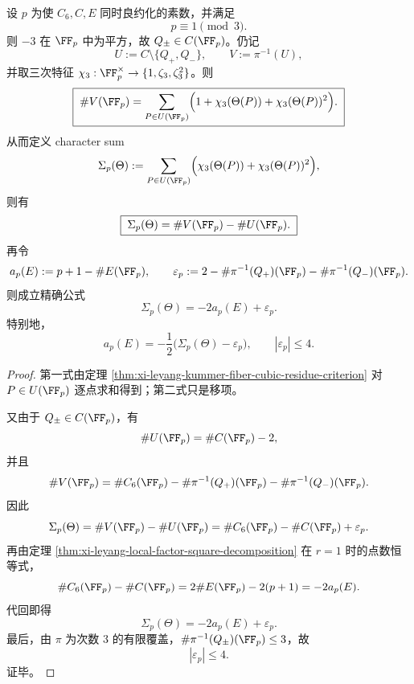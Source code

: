 \begin{corollary}\label{cor:xi-leyang-split-prime-cubic-character-sum-trace}
设 \(p\) 为使 \(C_6,C,E\) 同时良约化的素数，并满足
\[
p\equiv 1\pmod 3.
\]
则 \(-3\) 在 \(\FF_p\) 中为平方，故 \(Q_\pm\in C(\FF_p)\)。仍记
\[
U:=C\setminus\{Q_+,Q_-\},
\qquad
V:=\pi^{-1}(U),
\]
并取三次特征 \(\chi_3:\FF_p^\times\to\{1,\zeta_3,\zeta_3^2\}\)。则
\[
\boxed{\;
\#V(\FF_p)
=
\sum_{P\in U(\FF_p)}
\Bigl(1+\chi_3(\Theta(P))+\chi_3(\Theta(P))^2\Bigr).\;}
\]
从而定义 character sum
\[
\Sigma_p(\Theta):=
\sum_{P\in U(\FF_p)}
\Bigl(\chi_3(\Theta(P))+\chi_3(\Theta(P))^2\Bigr),
\]
则有
\[
\boxed{\;
\Sigma_p(\Theta)=\#V(\FF_p)-\#U(\FF_p).\;}
\]
再令
\[
a_p(E):=p+1-\#E(\FF_p),
\qquad
\varepsilon_p:=2-\#\pi^{-1}(Q_+)(\FF_p)-\#\pi^{-1}(Q_-)(\FF_p).
\]
则成立精确公式
\[
\boxed{\;
\Sigma_p(\Theta)=-2a_p(E)+\varepsilon_p.\;}
\]
特别地，
\[
\boxed{\;
a_p(E)=-\frac12\bigl(\Sigma_p(\Theta)-\varepsilon_p\bigr),\qquad
|\varepsilon_p|\le 4.\;}
\]
\end{corollary}
\begin{proof}
第一式由定理 \ref{thm:xi-leyang-kummer-fiber-cubic-residue-criterion} 对 \(P\in U(\FF_p)\) 逐点求和得到；第二式只是移项。

又由于 \(Q_\pm\in C(\FF_p)\)，有
\[
\#U(\FF_p)=\#C(\FF_p)-2,
\]
并且
\[
\#V(\FF_p)=\#C_6(\FF_p)-\#\pi^{-1}(Q_+)(\FF_p)-\#\pi^{-1}(Q_-)(\FF_p).
\]
因此
\[
\Sigma_p(\Theta)
=\#V(\FF_p)-\#U(\FF_p)
=\#C_6(\FF_p)-\#C(\FF_p)+\varepsilon_p.
\]
再由定理 \ref{thm:xi-leyang-local-factor-square-decomposition} 在 \(r=1\) 时的点数恒等式，
\[
\#C_6(\FF_p)-\#C(\FF_p)=2\#E(\FF_p)-2(p+1)=-2a_p(E).
\]
代回即得
\[
\Sigma_p(\Theta)=-2a_p(E)+\varepsilon_p.
\]
最后，由 \(\pi\) 为次数 \(3\) 的有限覆盖，\(\#\pi^{-1}(Q_\pm)(\FF_p)\le 3\)，故
\[
|\varepsilon_p|\le 4.
\]
证毕。
\end{proof}

\endinput
